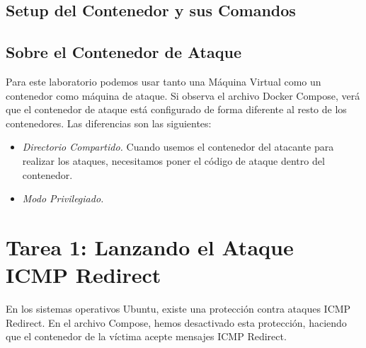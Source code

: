 \subsection{Setup del Contenedor y sus Comandos}




\subsection{Sobre el Contenedor de Ataque}

Para este laboratorio podemos usar tanto una Máquina Virtual como un contenedor como máquina de ataque. Si observa el archivo Docker Compose, verá que el contenedor de ataque está configurado de forma diferente al resto de los contenedores. Las diferencias son las siguientes:

\begin{itemize}
\item \textit{Directorio Compartido.} Cuando usemos el contenedor del atacante para realizar los ataques, necesitamos poner el código de ataque dentro del contenedor.


\item \textit{Modo Privilegiado.}


\end{itemize}


\section{Tarea 1: Lanzando el Ataque ICMP Redirect}

En los sistemas operativos Ubuntu, existe una protección contra ataques ICMP Redirect. En el archivo Compose, hemos desactivado esta protección, haciendo que el contenedor de la víctima acepte mensajes ICMP Redirect.

